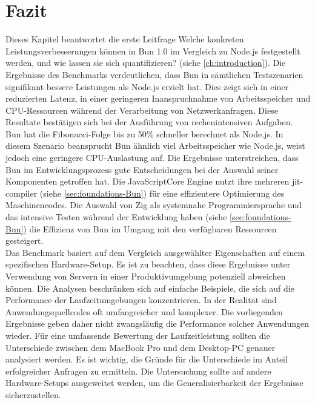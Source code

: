 \section{Fazit} \label{sec:performance-conclusion}
Dieses Kapitel beantwortet die erste Leitfrage \glqq Welche konkreten Leistungsverbesserungen können in Bun 1.0 im Vergleich zu Node.js festgestellt werden, und wie lassen sie sich quantifizieren?\grqq{} (siehe \autoref{ch:introduction}). Die Ergebnisse des Benchmarks verdeutlichen, dass Bun in sämtlichen Testszenarien signifikant bessere Leistungen als Node.js erzielt hat. Dies zeigt sich in einer reduzierten Latenz, in einer geringeren Inanspruchnahme von Arbeitsspeicher und CPU-Ressourcen während der Verarbeitung von Netzwerkanfragen. Diese Resultate bestätigen sich bei der Ausführung von rechenintensiven Aufgaben. Bun hat die Fibonacci-Folge bis zu 50\% schneller berechnet als Node.js. In diesem Szenario beansprucht Bun ähnlich viel Arbeitsspeicher wie Node.js, weist jedoch eine geringere CPU-Auslastung auf. \newline
Die Ergebnisse unterstreichen, dass Bun im Entwicklungsprozess gute Entscheidungen bei der Auswahl seiner Komponenten getroffen hat. Die JavaScriptCore Engine nutzt ihre mehreren \ac{jit-compiler} (siehe \autoref{sec:foundations-Bun}) für eine effizientere Optimierung des Maschinencodes. Die Auswahl von Zig als systemnahe Programmiersprache und das intensive Testen während der Entwicklung haben (siehe \autoref{sec:foundations-Bun}) die Effizienz von Bun im Umgang mit den verfügbaren Ressourcen gesteigert.\\

\noindent
Das Benchmark basiert auf dem Vergleich ausgewählter Eigenschaften auf einem spezifischen Hardware-Setup. Es ist zu beachten, dass diese Ergebnisse unter Verwendung von Servern in einer Produktivumgebung potenziell abweichen können. Die Analysen beschränken sich auf einfache Beispiele, die sich auf die Performance der Laufzeitumgebungen konzentrieren. In der Realität sind Anwendungsquellcodes oft umfangreicher und komplexer. Die vorliegenden Ergebnisse geben daher nicht zwangsläufig die Performance solcher Anwendungen wieder. Für eine umfassende Bewertung der Laufzeitleistung sollten die Unterschiede zwischen dem MacBook Pro und dem Desktop-PC genauer analysiert werden. Es ist wichtig, die Gründe für die Unterschiede im Anteil erfolgreicher Anfragen zu ermitteln. Die Untersuchung sollte auf andere Hardware-Setups ausgeweitet werden, um die Generalisierbarkeit der Ergebnisse sicherzustellen.